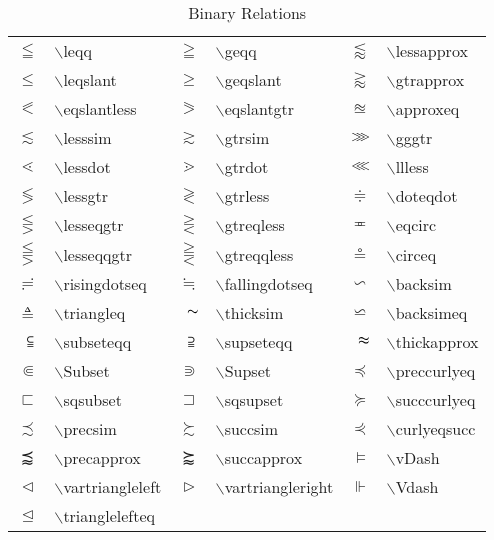 \begin{table}
\centering
\caption{Binary Relations}
\vspace{\baselineskip}
\tablerule
\begin{tabular}{rlrlrl}
$\leqq$&$\backslash$leqq&
$\geqq$&$\backslash$geqq&
$\lessapprox$&$\backslash$lessapprox\\
$\leqslant$&$\backslash$leqslant&
$\geqslant$&$\backslash$geqslant&
$\gtrapprox$&$\backslash$gtrapprox\\
$\eqslantless$&$\backslash$eqslantless&
$\eqslantgtr$&$\backslash$eqslantgtr&
$\approxeq$&$\backslash$approxeq\\
$\lesssim$&$\backslash$lesssim&
$\gtrsim$&$\backslash$gtrsim&
$\gggtr$&$\backslash$gggtr\\
$\lessdot$&$\backslash$lessdot&
$\gtrdot$&$\backslash$gtrdot&
$\llless$&$\backslash$llless\\
$\lessgtr$&$\backslash$lessgtr&
$\gtrless$&$\backslash$gtrless&
$\doteqdot$&$\backslash$doteqdot\\
$\lesseqgtr$&$\backslash$lesseqgtr&
$\gtreqless$&$\backslash$gtreqless&
$\eqcirc$&$\backslash$eqcirc\\
$\lesseqqgtr$&$\backslash$lesseqqgtr&
$\gtreqqless$&$\backslash$gtreqqless&
$\circeq$&$\backslash$circeq\\
$\risingdotseq$&$\backslash$risingdotseq&
$\fallingdotseq$&$\backslash$fallingdotseq&
$\backsim$&$\backslash$backsim\\
$\triangleq$&$\backslash$triangleq&
$\thicksim$&$\backslash$thicksim&
$\backsimeq$&$\backslash$backsimeq\\
$\subseteqq$&$\backslash$subseteqq&
$\supseteqq$&$\backslash$supseteqq&
$\thickapprox$&$\backslash$thickapprox\\
$\Subset$&$\backslash$Subset&
$\Supset$&$\backslash$Supset&
$\preccurlyeq$&$\backslash$preccurlyeq\\
$\sqsubset$&$\backslash$sqsubset&
$\sqsupset$&$\backslash$sqsupset&
$\succcurlyeq$&$\backslash$succcurlyeq\\
$\precsim$&$\backslash$precsim&
$\succsim$&$\backslash$succsim&
$\curlyeqprec$&$\backslash$curlyeqsucc\\
$\precapprox$&$\backslash$precapprox&
$\succapprox$&$\backslash$succapprox&
$\vDash$&$\backslash$vDash\\
$\vartriangleleft$&$\backslash$vartriangleleft&
$\vartriangleright$&$\backslash$vartriangleright&
$\Vdash$&$\backslash$Vdash\\
$\trianglelefteq$&$\backslash$trianglelefteq&

\end{tabular}
\end{table}

